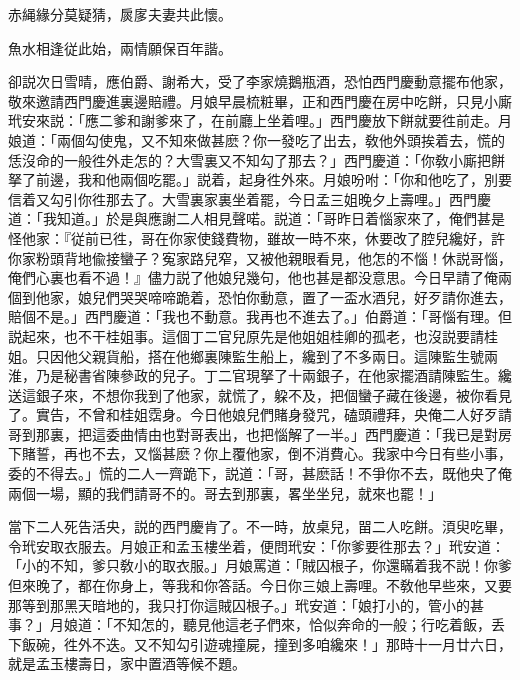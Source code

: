 \begin{myquote}
赤䋲緣分莫疑猜，扊扅夫妻共此懷。

魚水相逢従此始，兩情願保百年諧。
\end{myquote}

卻説次日雪晴，應伯爵、謝希大，受了李家燒鵝瓶酒，恐怕西門慶動意擺布他家，敬來邀請西門慶進裏邊賠禮。月娘早晨梳粧畢，正和西門慶在房中吃餅，只見小廝玳安來説：「應二爹和謝爹來了，在前廳上坐着哩。」西門慶放下餅就要徃前走。月娘道：「兩個勾使鬼，又不知來做甚麽？你一發吃了出去，敎他外頭挨着去，慌的恁沒命的一般徃外走怎的？大雪裏又不知勾了那去？」西門慶道：「你敎小廝把餅拏了前邊，我和他兩個吃罷。」説着，起身徃外來。月娘吩咐：「你和他吃了，別要信着又勾引你徃那去了。大雪裏家裏坐着罷，今日孟三姐晚夕上壽哩。」西門慶道：「我知道。」於是與應謝二人相見聲喏。説道：「哥昨日着惱家來了，俺們甚是怪他家：『従前已徃，哥在你家使錢費物，雖故一時不來，休要改了腔兒纔好，許你家粉頭背地偸接蠻子？寃家路兒窄，又被他親眼看見，他怎的不惱！休説哥惱，俺們心裏也看不過！』儘力説了他娘兒幾句，他也甚是都没意思。今日早請了俺兩個到他家，娘兒們哭哭啼啼跪着，恐怕你動意，置了一盃水酒兒，好歹請你進去，賠個不是。」西門慶道：「我也不動意。我再也不進去了。」伯爵道：「哥惱有理。但説起來，也不干桂姐事。這個丁二官兒原先是他姐姐桂卿的孤老，也沒説要請桂姐。只因他父親貨船，搭在他鄉裏陳監生船上，纔到了不多兩日。這陳監生號兩淮，乃是秘書省陳參政的兒子。丁二官現拏了十兩銀子，在他家擺酒請陳監生。纔送這銀子來，不想你我到了他家，就慌了，躱不及，把個蠻子藏在後邊，被你看見了。實告，不曾和桂姐霑身。今日他娘兒們賭身發咒，磕頭禮拜，央俺二人好歹請哥到那裏，把這委曲情由也對哥表出，也把惱解了一半。」西門慶道：「我已是對房下賭誓，再也不去，又惱甚麽？你上覆他家，倒不消費心。我家中今日有些小事，委的不得去。」慌的二人一齊跪下，説道：「哥，甚麽話！不爭你不去，既他央了俺兩個一場，顯的我們請哥不的。哥去到那裏，畧坐坐兒，就來也罷！」

當下二人死告活央，説的西門慶肯了。不一時，放桌兒，㽞二人吃餅。湏臾吃畢，令玳安取衣服去。月娘正和孟玉樓坐着，便問玳安：「你爹要徃那去？」玳安道：「小的不知，爹只敎小的取衣服。」月娘罵道：「賊囚根子，你還瞞着我不説！你爹但來晚了，都在你身上，等我和你答話。今日你三娘上壽哩。不敎他早些來，又要那等到那黑天暗地的，我只打你這賊囚根子。」玳安道：「娘打小的，管小的甚事？」月娘道：「不知怎的，聽見他這老子們來，恰似奔命的一般；行吃着飯，丢下飯碗，徃外不迭。又不知勾引遊魂撞屍，撞到多咱纔來！」那時十一月廿六日，就是孟玉樓壽日，家中置酒等候不題。

